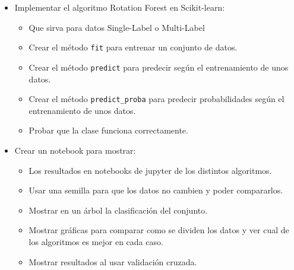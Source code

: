 \begin{itemize}
\item Implementar el algoritmo Rotation Forest en Scikit-learn:
	\begin{itemize}
		\item Que sirva para datos Single-Label o Multi-Label
		\item Crear el método \texttt{fit} para entrenar un conjunto de datos.
		\item Crear el método \texttt{predict} para predecir según el entrenamiento de unos datos.
		\item Crear el método \texttt{predict\_proba} para predecir probabilidades según el entrenamiento de unos datos.
		\item Probar que la clase funciona correctamente.
	\end{itemize}
\item Crear un notebook para mostrar:
	\begin{itemize}
		\item Los resultados en notebooks de jupyter de los distintos algoritmos.
		\item Usar una semilla para que los datos no cambien y poder compararlos.
		\item Mostrar en un árbol la clasificación del conjunto.
		\item Mostrar gráficas para comparar como se dividen los datos y ver cual de los algoritmos es mejor en cada caso.
		\item Mostrar resultados al usar validación cruzada.
	\end{itemize}
\end{itemize}
